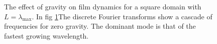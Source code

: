 \documentclass[a4paper,12pt]{article}
\begin{document}
  \begin{figure} 
   \centering
   \caption{The effect of gravity on film dynamics for a square domain with $L=\lambda_\text{max}$. In fig \ref{fig_ic_effect}The discrete Fourier transforms show a cascade of frequencies for zero gravity. The dominant mode is that of the fastest growing wavelength.}
   \label{fig_ic_effect}
  \end{figure}
\end{document}
